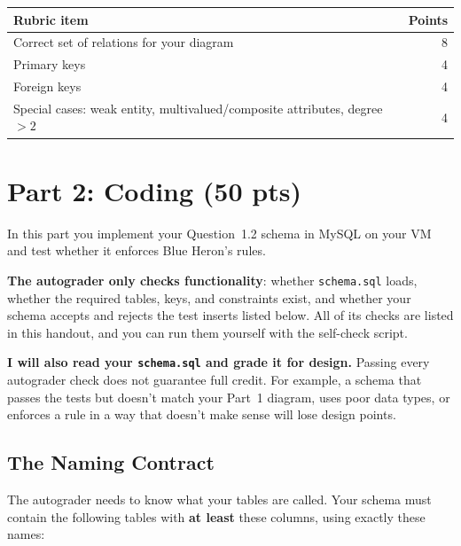 \documentclass[11pt]{article}
\newcommand{\code}[1]{\texttt{#1}}
\begin{document}
\begin{center}
\begin{tabular}{@{}lr@{}}
\toprule
\textbf{Rubric item} & \textbf{Points} \\
\midrule
Correct set of relations for your diagram & 8 \\
Primary keys & 4 \\
Foreign keys & 4 \\
Special cases: weak entity, multivalued/composite attributes, degree $>2$ & 4 \\
\bottomrule
\end{tabular}
\end{center}

\newpage
\section*{Part 2: Coding \hfill (50 pts)}

In this part you implement your Question~1.2 schema in MySQL on your VM and test whether it enforces
Blue Heron's rules.

\begin{warnbox}[title=How Part 2 is graded]
\textbf{The autograder only checks functionality}: whether \code{schema.sql} loads, whether the
required tables, keys, and constraints exist, and whether your schema accepts and rejects the test
inserts listed below. All of its checks are listed in this handout, and you can run them yourself
with the self-check script.

\textbf{I will also read your \code{schema.sql} and grade it for design.} Passing every autograder
check does not guarantee full credit. For example, a schema that passes the tests but doesn't match
your Part~1 diagram, uses poor data types, or enforces a rule in a way that doesn't make sense will
lose design points.
\end{warnbox}

\subsection*{The Naming Contract}
\label{sec:contract}

The autograder needs to know what your tables are called. Your schema must contain the following
tables with \textbf{at least} these columns, using exactly these names:
\end{document}
